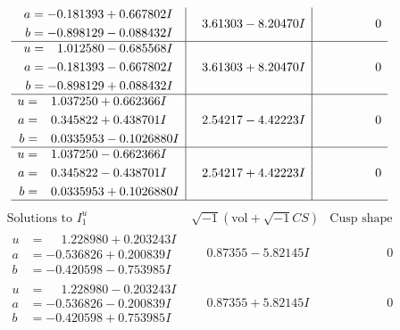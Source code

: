 \documentclass[1p]{elsarticle_modified}
\theoremstyle{definition}
\newcommand{\I}{\sqrt{-1}}
\begin{document}
$$\begin{array}{c|c|c}
\begin{aligned}
a &= -0.181393 + 0.667802 I \\
b &= -0.898129 - 0.088432 I\end{aligned}
 & \phantom{-}3.61303 - 8.20470 I & \phantom{-0.000000 } 0 \\ \hline\begin{aligned}
u &= \phantom{-}1.012580 - 0.685568 I \\
a &= -0.181393 - 0.667802 I \\
b &= -0.898129 + 0.088432 I\end{aligned}
 & \phantom{-}3.61303 + 8.20470 I & \phantom{-0.000000 } 0 \\ \hline\begin{aligned}
u &= \phantom{-}1.037250 + 0.662366 I \\
a &= \phantom{-}0.345822 + 0.438701 I \\
b &= \phantom{-}0.0335953 - 0.1026880 I\end{aligned}
 & \phantom{-}2.54217 - 4.42223 I & \phantom{-0.000000 } 0 \\ \hline\begin{aligned}
u &= \phantom{-}1.037250 - 0.662366 I \\
a &= \phantom{-}0.345822 - 0.438701 I \\
b &= \phantom{-}0.0335953 + 0.1026880 I\end{aligned}
 & \phantom{-}2.54217 + 4.42223 I & \phantom{-0.000000 } 0\\
 \hline 
 \end{array}$$\newpage$$\begin{array}{c|c|c}  
\text{Solutions to }I^u_{1}& \I (\text{vol} + \sqrt{-1}CS) & \text{Cusp shape}\\
 \hline 
\begin{aligned}
u &= \phantom{-}1.228980 + 0.203243 I \\
a &= -0.536826 + 0.200839 I \\
b &= -0.420598 - 0.753985 I\end{aligned}
 & \phantom{-}0.87355 - 5.82145 I & \phantom{-0.000000 } 0 \\ \hline\begin{aligned}
u &= \phantom{-}1.228980 - 0.203243 I \\
a &= -0.536826 - 0.200839 I \\
b &= -0.420598 + 0.753985 I\end{aligned}
 & \phantom{-}0.87355 + 5.82145 I & \phantom{-0.000000 } 0 \\ \hline\begin{aligned}

\end{aligned}
\end{array}$$
\end{document}
